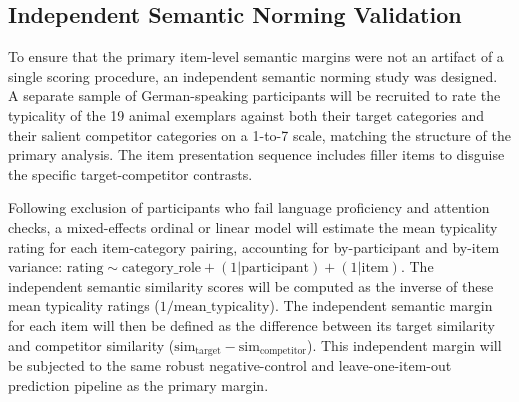 
\subsection{Independent Semantic Norming Validation}

To ensure that the primary item-level semantic margins were not an artifact of a single scoring procedure, an independent semantic norming study was designed. A separate sample of German-speaking participants will be recruited to rate the typicality of the 19 animal exemplars against both their target categories and their salient competitor categories on a 1-to-7 scale, matching the structure of the primary analysis. The item presentation sequence includes filler items to disguise the specific target-competitor contrasts.

Following exclusion of participants who fail language proficiency and attention checks, a mixed-effects ordinal or linear model will estimate the mean typicality rating for each item-category pairing, accounting for by-participant and by-item variance: $\text{rating} \sim \text{category\_role} + (1|\text{participant}) + (1|\text{item})$. The independent semantic similarity scores will be computed as the inverse of these mean typicality ratings ($1 / \text{mean\_typicality}$). The independent semantic margin for each item will then be defined as the difference between its target similarity and competitor similarity ($\text{sim}_{\text{target}} - \text{sim}_{\text{competitor}}$). This independent margin will be subjected to the same robust negative-control and leave-one-item-out prediction pipeline as the primary margin.
